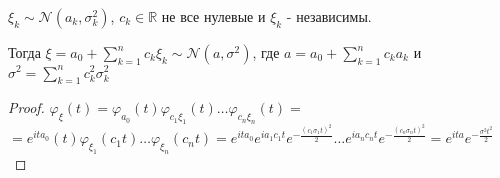 \begin{theorem}
    $\xi_k \sim \mathcal{N} (a_k, \sigma_k^2)$, $c_k \in \mathbb{R}$ не все нулевые и $\xi_k$ - независимы.

    Тогда $\xi = a_0 + \sum_{k = 1}^n c_k \xi_k  \sim \mathcal{N} (a, \sigma^2)$, где
    $a = a_0 + \sum_{k = 1}^n c_k a_k$ и $\sigma^2 = \sum_{k = 1}^n c_k^2 \sigma_k^2$
\end{theorem}

\begin{proof}
    $\varphi_{\xi} (t) = \varphi_{a_0} (t) \varphi_{c_1\xi_1} (t) \ldots \varphi_{c_n\xi_n} (t) = $
    $=  e^{ita_0} (t) \varphi_{\xi_1} (c_1t) \ldots \varphi_{\xi_n} (c_nt) = 
    e^{ita_0} e^{ia_1c_1 t} e^{- \frac{(c_1 \sigma_1 t)^2}{2}} \ldots e^{ia_nc_n t} e^{- \frac{(c_n \sigma_n t)^2}{2}} =
    e^{ita} e^{- \frac{\sigma^2t^2}{2}} $
\end{proof}


